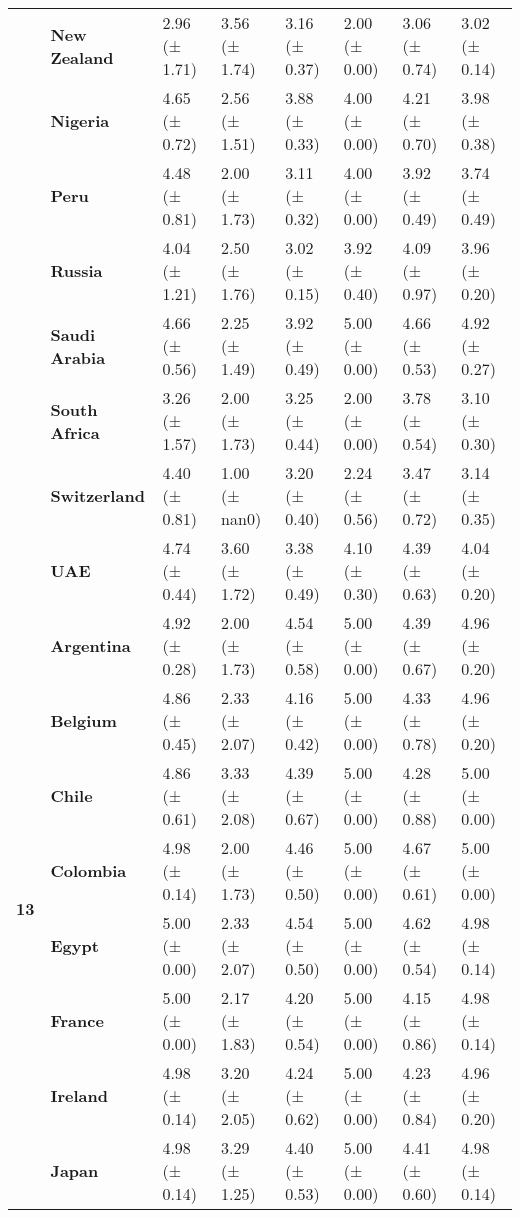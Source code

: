 \begin{longtable}{llllllll}
\textbf{} & \textbf{New Zealand} & 2.96 (± 1.71) & 3.56 (± 1.74) & 3.16 (± 0.37) & 2.00 (± 0.00) & 3.06 (± 0.74) & 3.02 (± 0.14) \\
\textbf{} & \textbf{Nigeria} & 4.65 (± 0.72) & 2.56 (± 1.51) & 3.88 (± 0.33) & 4.00 (± 0.00) & 4.21 (± 0.70) & 3.98 (± 0.38) \\
\textbf{} & \textbf{Peru} & 4.48 (± 0.81) & 2.00 (± 1.73) & 3.11 (± 0.32) & 4.00 (± 0.00) & 3.92 (± 0.49) & 3.74 (± 0.49) \\
\textbf{} & \textbf{Russia} & 4.04 (± 1.21) & 2.50 (± 1.76) & 3.02 (± 0.15) & 3.92 (± 0.40) & 4.09 (± 0.97) & 3.96 (± 0.20) \\
\textbf{} & \textbf{Saudi Arabia} & 4.66 (± 0.56) & 2.25 (± 1.49) & 3.92 (± 0.49) & 5.00 (± 0.00) & 4.66 (± 0.53) & 4.92 (± 0.27) \\
\textbf{} & \textbf{South Africa} & 3.26 (± 1.57) & 2.00 (± 1.73) & 3.25 (± 0.44) & 2.00 (± 0.00) & 3.78 (± 0.54) & 3.10 (± 0.30) \\
\textbf{} & \textbf{Switzerland} & 4.40 (± 0.81) & 1.00 (± nan0) & 3.20 (± 0.40) & 2.24 (± 0.56) & 3.47 (± 0.72) & 3.14 (± 0.35) \\
\textbf{} & \textbf{UAE} & 4.74 (± 0.44) & 3.60 (± 1.72) & 3.38 (± 0.49) & 4.10 (± 0.30) & 4.39 (± 0.63) & 4.04 (± 0.20) \\
\cline{1-8}
\multirow[t]{19}{*}{\textbf{13}} & \textbf{Argentina} & 4.92 (± 0.28) & 2.00 (± 1.73) & 4.54 (± 0.58) & 5.00 (± 0.00) & 4.39 (± 0.67) & 4.96 (± 0.20) \\
\textbf{} & \textbf{Belgium} & 4.86 (± 0.45) & 2.33 (± 2.07) & 4.16 (± 0.42) & 5.00 (± 0.00) & 4.33 (± 0.78) & 4.96 (± 0.20) \\
\textbf{} & \textbf{Chile} & 4.86 (± 0.61) & 3.33 (± 2.08) & 4.39 (± 0.67) & 5.00 (± 0.00) & 4.28 (± 0.88) & 5.00 (± 0.00) \\
\textbf{} & \textbf{Colombia} & 4.98 (± 0.14) & 2.00 (± 1.73) & 4.46 (± 0.50) & 5.00 (± 0.00) & 4.67 (± 0.61) & 5.00 (± 0.00) \\
\textbf{} & \textbf{Egypt} & 5.00 (± 0.00) & 2.33 (± 2.07) & 4.54 (± 0.50) & 5.00 (± 0.00) & 4.62 (± 0.54) & 4.98 (± 0.14) \\
\textbf{} & \textbf{France} & 5.00 (± 0.00) & 2.17 (± 1.83) & 4.20 (± 0.54) & 5.00 (± 0.00) & 4.15 (± 0.86) & 4.98 (± 0.14) \\
\textbf{} & \textbf{Ireland} & 4.98 (± 0.14) & 3.20 (± 2.05) & 4.24 (± 0.62) & 5.00 (± 0.00) & 4.23 (± 0.84) & 4.96 (± 0.20) \\
\textbf{} & \textbf{Japan} & 4.98 (± 0.14) & 3.29 (± 1.25) & 4.40 (± 0.53) & 5.00 (± 0.00) & 4.41 (± 0.60) & 4.98 (± 0.14) \\

\end{longtable}
